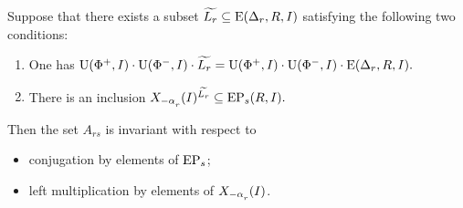 \begin{lemma}\label{Stein_reduction} 
Suppose that there exists a subset $\widetilde{L_r} \subseteq \operatorname{E}(\Delta_r, R, I)$ satisfying the following two conditions:
\begin{enumerate}[label=(\alph*)] 
 \item\label{stein_cond1} One has $\operatorname{U}(\Phi^+, I)\cdot \operatorname{U}(\Phi^-, I) \cdot \widetilde{L_r} = \operatorname{U}(\Phi^+, I)\cdot \operatorname{U}(\Phi^-, I) \cdot \operatorname{E}(\Delta_r, R, I).$
 \item\label{stein_cond2} There is an inclusion $X_{-\alpha\ssub{r}}(I)^{\widetilde{L_r}} \subseteq \EP_s(R, I).$
\end{enumerate}
Then the set $A_{rs}$ is invariant with respect to
\begin{itemize}
 \item conjugation by elements of $\operatorname{EP}_s$;
 \item left multiplication by elements of $X_{-\alpha\ssub{r}}(I)$.
\end{itemize} \end{lemma}
